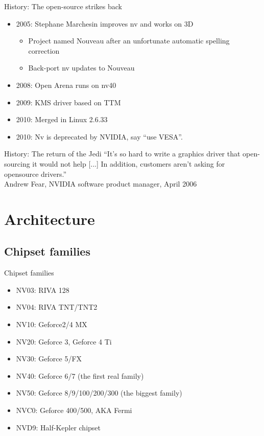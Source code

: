 \documentclass[11pt,english,compress]{beamer}
\begin{document}
	\begin{frame}
		\begin{block}{History: The open-source strikes back}
			\begin{itemize}
				\item 2005: Stephane Marchesin improves nv and works on 3D
				\begin{itemize}
					\item Project named Nouveau after an unfortunate automatic spelling correction
					\item Back-port nv updates to Nouveau
				\end{itemize}
				\item 2008: Open Arena runs on nv40
				\item 2009: KMS driver based on TTM
				\item 2010: Merged in Linux 2.6.33
				\item 2010: Nv is deprecated by NVIDIA, say ``use VESA''.
			\end{itemize}
		\end{block}
	\end{frame}

	\begin{frame}
		\begin{block}{History: The return of the Jedi}
			``It's so hard to write a graphics driver that open-sourcing it
			would not help [...] In addition, customers aren't asking for opensource drivers.''\\
			Andrew Fear, NVIDIA software product manager, April 2006
		\end{block}
	\end{frame}

\section{Architecture}
	\subsection{Chipset families}
		\begin{frame}
			\begin{block}{Chipset families}
				\begin{itemize}
					\item NV03: RIVA 128
					\item NV04: RIVA TNT/TNT2
					\item NV10: Geforce2/4 MX
					\item NV20: Geforce 3, Geforce 4 Ti
					\item NV30: Geforce 5/FX
					\item NV40: Geforce 6/7 (the first real family) 
					\item NV50: Geforce 8/9/100/200/300 (the biggest family)
					\item NVC0: Geforce 400/500, AKA Fermi
					\item NVD9: Half-Kepler chipset
				\end{itemize}
			\end{block}
		\end{frame}
\end{document}
